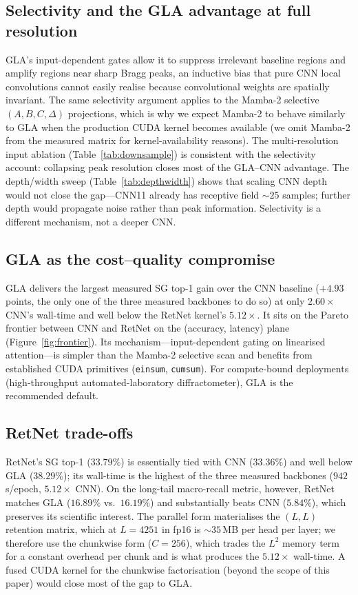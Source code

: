 \documentclass[final]{ws-ijwmip}
\begin{document}
\subsection{Selectivity and the GLA advantage at full resolution}

GLA's input-dependent gates allow it to suppress irrelevant baseline
regions and amplify regions near sharp Bragg peaks, an inductive bias
that pure CNN local convolutions cannot easily realise because
convolutional weights are spatially invariant. The same selectivity
argument applies to the Mamba-2 selective $(A,B,C,\Delta)$ projections,
which is why we expect Mamba-2 to behave similarly to GLA when the
production CUDA kernel becomes available (we omit Mamba-2 from the
measured matrix for kernel-availability reasons). The multi-resolution
input ablation (Table~\ref{tab:downsample}) is consistent with the
selectivity account: collapsing peak resolution closes most of the
GLA--CNN advantage. The depth/width sweep (Table~\ref{tab:depthwidth})
shows that scaling CNN depth would not close the gap---CNN11 already
has receptive field $\sim 25$ samples; further depth would propagate
noise rather than peak information. Selectivity is a different
mechanism, not a deeper CNN.


\subsection{GLA as the cost--quality compromise}

GLA delivers the largest measured SG top-1 gain over the CNN baseline
($+4.93$ points, the only one of the three measured backbones to do so)
at only $2.60\times$ CNN's wall-time and well below the RetNet kernel's
$5.12\times$. It sits on the Pareto frontier between CNN and RetNet on
the (accuracy, latency) plane (Figure~\ref{fig:frontier}). Its
mechanism---input-dependent gating on linearised attention---is simpler
than the Mamba-2 selective scan and benefits from established CUDA
primitives (\texttt{einsum}, \texttt{cumsum}). For compute-bound
deployments (high-throughput automated-laboratory diffractometer),
GLA is the recommended default.


\subsection{RetNet trade-offs}

RetNet's SG top-1 ($33.79\%$) is essentially tied with CNN ($33.36\%$)
and well below GLA ($38.29\%$); its wall-time is the highest of the
three measured backbones ($942\,$s/epoch, $5.12\times$ CNN). On the
long-tail macro-recall metric, however, RetNet matches GLA
($16.89\%$ vs.\ $16.19\%$) and substantially beats CNN ($5.84\%$),
which preserves its scientific interest. The parallel form
materialises the $(L,L)$ retention matrix, which at $L=4251$ in fp16
is $\sim 35\,$MB per head per layer; we therefore use the chunkwise
form ($C=256$), which trades the $L^2$ memory term for a constant
overhead per chunk and is what produces the $5.12\times$ wall-time.
A fused CUDA kernel for the chunkwise factorisation (beyond the scope
of this paper) would close most of the gap to GLA.
\end{document}
